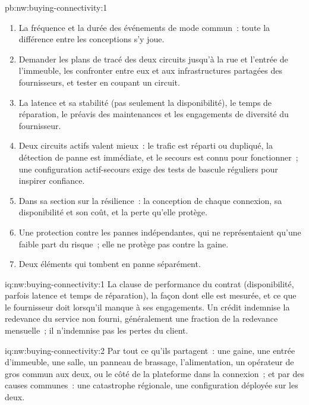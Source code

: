 \begin{solution}{pb:nw:buying-connectivity:1}
\begin{enumerate}[resume]
\item La fréquence et la durée des événements de mode commun~: toute la différence entre les conceptions s'y joue.
\item Demander les plans de tracé des deux circuits jusqu'à la rue et l'entrée de l'immeuble, les confronter entre eux et aux
  infrastructures partagées des fournisseurs, et tester en coupant un circuit.
\item La latence et sa stabilité (pas seulement la disponibilité), le temps de réparation, le préavis des maintenances et les engagements de diversité du fournisseur.
\item Deux circuits actifs valent mieux~: le trafic est réparti ou dupliqué, la détection de panne est immédiate, et le secours est connu pour fonctionner~; une configuration actif-secours
  exige des tests de bascule réguliers pour inspirer confiance.
\item Dans sa section sur la résilience~: la conception de chaque connexion, sa disponibilité et son coût, et la perte qu'elle protège.
\item Une protection contre les pannes indépendantes, qui ne représentaient qu'une faible part du risque~; elle ne protège pas contre la gaine.
\item Deux éléments qui tombent en panne séparément.
\end{enumerate}
\end{solution}

\begin{solution}{iq:nw:buying-connectivity:1}
La clause de performance du contrat (disponibilité, parfois latence et temps de réparation), la façon dont elle est mesurée, et ce que le fournisseur doit
lorsqu'il manque à ses engagements. Un crédit indemnise la redevance du service non fourni, généralement une fraction de la redevance mensuelle~; il n'indemnise pas les
pertes du client.
\end{solution}

\begin{solution}{iq:nw:buying-connectivity:2}
Par tout ce qu'ils partagent~: une gaine, une entrée d'immeuble, une salle, un panneau de brassage, l'alimentation, un opérateur de gros commun aux deux, ou le côté de la plateforme dans la connexion~;
et par des causes communes~: une catastrophe régionale, une configuration déployée sur les deux.
\end{solution}

